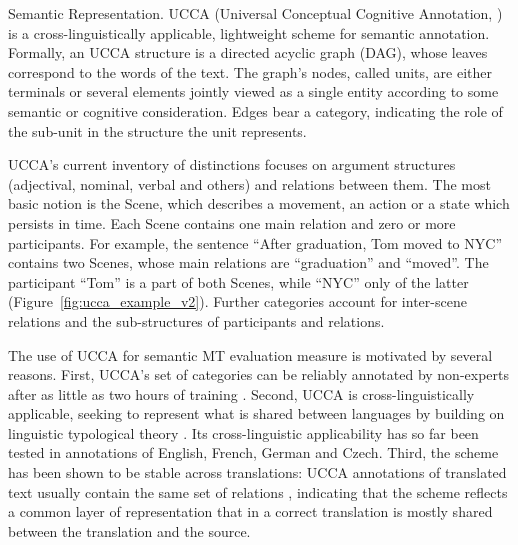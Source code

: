 \documentclass[11pt,letterpaper]{article}
\makeatletter
\renewcommand{\paragraph}{
  \@startsection{paragraph}{4}
  {\z@}{.3ex \@plus .3ex \@minus .2ex}{-1em}
  {\normalfont\normalsize\bfseries}
}
\newcommand{\figref}[1]{Figure~\ref{#1}}
\newcommand{\oa}[1]{}
\def\parcite#1{\cite{#1}}
\def\inparcite#1{\cite{#1}}
\makeatother
\begin{document}
\paragraph{Semantic Representation.}
UCCA (Universal Conceptual Cognitive Annotation, \inparcite{abend2013universal}) is a
cross-linguistically applicable, lightweight
scheme for semantic annotation. Formally, an UCCA structure is a directed acyclic graph (DAG),
whose leaves correspond to the words of the text.
The graph's nodes, called {\sc units}, are either terminals or several elements jointly
viewed as a single entity according to some semantic or cognitive consideration. Edges bear
a category, indicating the role of the sub-unit in the structure the unit
represents.

UCCA's current inventory of distinctions focuses on argument structures
(adjectival, nominal, verbal and others) and relations between them.
The most basic notion is the Scene, which describes a movement, an
action or a state which persists in time. Each Scene contains one main
relation and zero or more participants. For example, the sentence ``After graduation, Tom moved to NYC''
contains two Scenes, whose main relations are ``graduation'' and ``moved''.
The participant ``Tom'' is a part of both Scenes, while ``NYC'' only of the
latter (\figref{fig:ucca_example_v2}). Further categories account for
inter-scene relations and the sub-structures of participants and relations.

The use of UCCA for semantic MT evaluation measure is motivated by several reasons. 
First, UCCA's set of categories can
be reliably annotated by non-experts after as little as two hours
of training \parcite{marinotti2014}.
Second, UCCA is cross-linguistically applicable, seeking to
represent what is shared between languages by building on
linguistic typological theory \parcite{Dixon:10a,Dixon:10b,Dixon:12}.
Its cross-linguistic applicability has so far been tested in annotations of
English, French, German and Czech.
Third, the scheme has been shown to be stable across translations:
UCCA annotations of translated text usually contain the same set of relations
\parcite{sulem2015conceptual}, indicating that the scheme reflects
a common layer of representation that in a correct translation
is mostly shared between the translation and the source\oa{verb argument structure note?}. 

\end{document}
